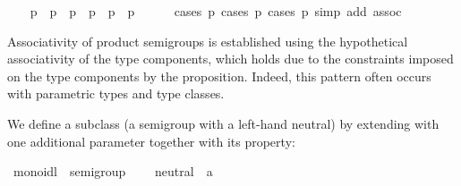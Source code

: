 \begin{isabellebody}
\ \ \isamarkupfalse%
\ {}p\ {}\ p\ {}\ p\ {}\ p\ {}\ {}p\ {}\ p\isanewline
\ \ \ \ \isamarkupfalse%
\ {}cases\ p\ cases\ p\ cases\ p\ {}simp\ add{}\ assoc{}%
\begin{isamarkuptxt}%
\noindent Associativity of product semigroups is established
using the hypothetical associativity \hyperlink{fact.assoc}{\mbox{}} of the type
components, which holds due to the  constraints
imposed on the type components by the \hyperlink{command.instance}{\mbox{}} proposition.
Indeed, this pattern often occurs with parametric types and type
classes.%
\end{isamarkuptxt}%
\isamarkuptrue%
\isamarkupfalse%
%
\endisatagproof
{\isafoldproof}%
%
\isadelimproof
%
\endisadelimproof
\isanewline
\isanewline
{}\isamarkupfalse%
%
\isamarkuptrue%
%
\begin{isamarkuptext}%
We define a subclass  (a semigroup with a
left-hand neutral) by extending  with one additional
parameter  together with its property:%
\end{isamarkuptext}%
\isamarkuptrue%
\isamarkupfalse%
\ monoidl\ {}\ semigroup\ {}\isanewline
\ \ \ neutral\ {}{}\ {}{}a{}\ {}{}{}{}{}\isanewline

\end{isabellebody}
